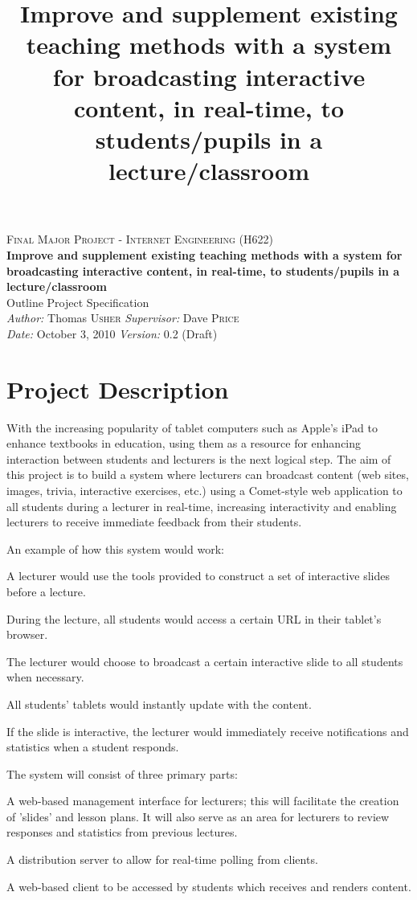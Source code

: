 \documentclass[a4papert,11pt,notitlepage]{ltxdoc}
\title{Improve and supplement existing teaching methods with a system for broadcasting interactive content, in real-time, to students/pupils in a lecture/classroom}
\begin{document}
\begin{center}
\textsc{\Large Final Major Project - Internet Engineering (H622)}\\[0.3cm]
{\Large \bfseries Improve and supplement existing teaching methods with a system for broadcasting interactive content, in real-time, to students/pupils in a lecture/classroom}\\[0.3cm]
{\Large Outline Project Specification}\\[0.3cm]
\emph{Author:} Thomas \textsc{Usher} \hspace{1cm} \emph{Supervisor:} Dave \textsc{Price}\\
\emph{Date:} October 3, 2010 \hspace{1cm} \emph{Version:} 0.2 (Draft)
\end{center}
\section{Project Description}
With the increasing popularity of tablet computers such as Apple's iPad to enhance textbooks in education, using them as a resource for enhancing interaction between students and lecturers is the next logical step. The aim of this project is to build a system where lecturers can broadcast content (web sites, images, trivia, interactive exercises, etc.) using a Comet-style web application to all students during a lecturer in real-time, increasing interactivity and enabling lecturers to receive immediate feedback from their students.

An example of how this system would work:
\begin{enumerate*}
\item A lecturer would use the tools provided to construct a set of interactive slides before a lecture.
\item During the lecture, all students would access a certain URL in their tablet's browser.
\item The lecturer would choose to broadcast a certain interactive slide to all students when necessary.
\item All students' tablets would instantly update with the content.
\item If the slide is interactive, the lecturer would immediately receive notifications and statistics when a student responds.
\end{enumerate*}

The system will consist of three primary parts:
\begin{itemize*}
\item A web-based management interface for lecturers; this will facilitate the creation of 'slides' and lesson plans. It will also serve as an area for lecturers to review responses and statistics from previous lectures.
\item A distribution server to allow for real-time polling from clients.
\item A web-based client to be accessed by students which receives and renders content.
\end{itemize*}
\end{document}
